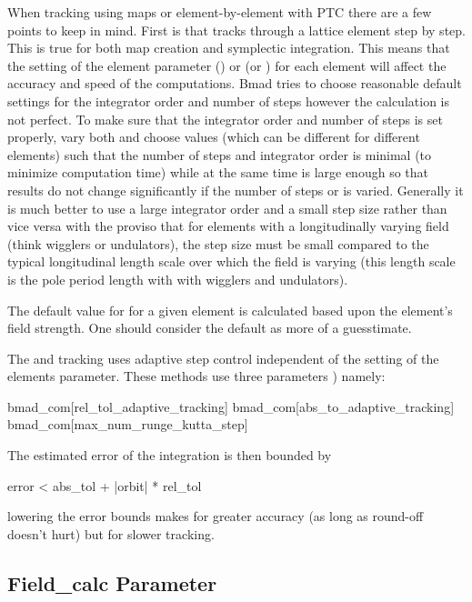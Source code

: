 When tracking using maps or element-by-element with PTC there are a few points to keep in
mind. First is that  tracks through a lattice element step by step. This is true for both
map creation and symplectic integration. This means that the setting of the element parameter
 ()
or  (or ) for each element will affect the accuracy and speed of the
computations. Bmad tries to choose reasonable default settings for the integrator order and number
of steps however the calculation is not perfect. To make sure that the integrator order and number
of steps is set properly, vary both and choose values (which can be different for different
elements) such that the number of steps and integrator order is minimal (to minimize computation
time) while at the same time is large enough so that results do not change significantly if the
number of steps or is varied. Generally it is much better to use a large integrator order and a
small step size rather than vice versa with the proviso that for elements with a longitudinally
varying field (think wigglers or undulators), the step size must be small compared to the typical
longitudinal length scale over which the field is varying (this length scale is the pole period
length with with wigglers and undulators).

The default value for  for a given element is calculated based upon the element's field
strength. One should consider the default as more of a guesstimate.

The  and  tracking uses adaptive step control independent of
the setting of the elements  parameter. These methods use three  parameters
) namely:
\begin{example}
  bmad_com[rel_tol_adaptive_tracking]
  bmad_com[abs_to_adaptive_tracking]
  bmad_com[max_num_runge_kutta_step]
\end{example}
The estimated error of the integration is then bounded by
\begin{example}
  error < abs_tol + |orbit| * rel_tol
\end{example}
lowering the error bounds makes for greater accuracy (as long as round-off 
doesn't hurt) but for slower tracking. 

\subsection{Field_calc Parameter}
\label{s:field.calc}

